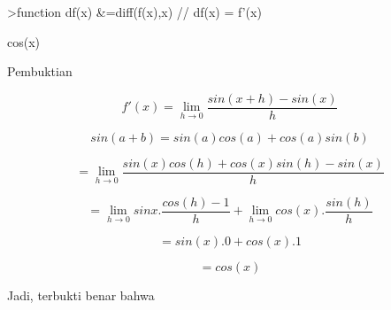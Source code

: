 \documentclass[a4paper,10pt]{article}
\begin{document}
\begin{eulernotebook}
\begin{eulercomment}
\begin{eulercomment}
\begin{eulercomment}
\begin{eulercomment}
\begin{eulercomment}
\begin{eulercomment}
\begin{eulercomment}
\begin{eulercomment}
\begin{eulercomment}
\begin{eulercomment}
\begin{eulercomment}
\begin{eulercomment}
\begin{eulercomment}
\begin{eulercomment}
\begin{eulercomment}
\begin{eulercomment}
\begin{euleroutput}
\end{euleroutput}
\begin{eulerprompt}
>function df(x) &=diff(f(x),x) // df(x) = f'(x)
\end{eulerprompt}
\begin{euleroutput}
  
                                  cos(x)
  
\end{euleroutput}
\begin{eulercomment}
Pembuktian

\end{eulercomment}
\begin{eulerformula}
\[
f'(x) = \lim_{h\to 0} \frac{sin(x+h)-sin(x)}{h}
\]
\end{eulerformula}
\begin{eulercomment}
\end{eulercomment}
\begin{eulerformula}
\[
sin(a+b)=sin(a)cos(a)+cos(a)sin(b)
\]
\end{eulerformula}
\begin{eulercomment}
\end{eulercomment}
\begin{eulerformula}
\[
= \lim_{h\to 0} \frac{sin(x)cos(h)+cos(x)sin(h)-sin(x)}{h}
\]
\end{eulerformula}
\begin{eulercomment}
\end{eulercomment}
\begin{eulerformula}
\[
= \lim_{h\to 0} sinx.\frac{cos(h)-1}{h}+\lim_{h\to 0} cos(x).\frac{sin(h)}{h}
\]
\end{eulerformula}
\begin{eulerformula}
\[
= sin(x).0+cos(x).1
\]
\end{eulerformula}
\begin{eulercomment}
\end{eulercomment}
\begin{eulerformula}
\[
= cos(x)
\]
\end{eulerformula}
\begin{eulercomment}
Jadi, terbukti benar bahwa


\end{eulercomment}
\end{eulercomment}
\end{eulercomment}
\end{eulercomment}
\end{eulercomment}
\end{eulercomment}
\end{eulercomment}
\end{eulercomment}
\end{eulercomment}
\end{eulercomment}
\end{eulercomment}
\end{eulercomment}
\end{eulercomment}
\end{eulercomment}
\end{eulercomment}
\end{eulercomment}
\end{eulercomment}
\end{eulernotebook}
\end{document}
